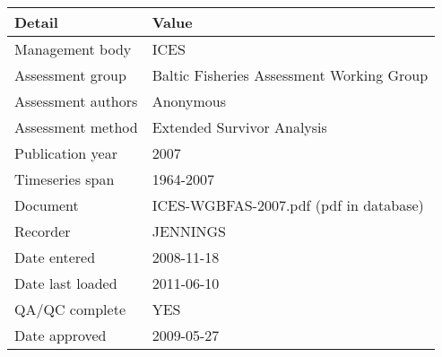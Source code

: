 \begin{table}[htb]
\centering
\begin{tabular}{lp{7cm}}
\toprule
Detail & Value \\
\midrule
Management body    & ICES                                      \\
Assessment group   & Baltic Fisheries Assessment Working Group \\
Assessment authors & Anonymous                                 \\
Assessment method  & Extended Survivor Analysis                \\
Publication year   & 2007                                      \\
Timeseries span    & 1964-2007                                 \\
Document           & ICES-WGBFAS-2007.pdf (pdf in database)    \\
Recorder           & JENNINGS                                  \\
Date entered       & 2008-11-18                                \\
Date last loaded   & 2011-06-10                                \\
QA/QC complete     & YES                                       \\
Date approved      & 2009-05-27                                \\
\bottomrule
\end{tabular}
\label{tab:assessdet}
\end{table}
